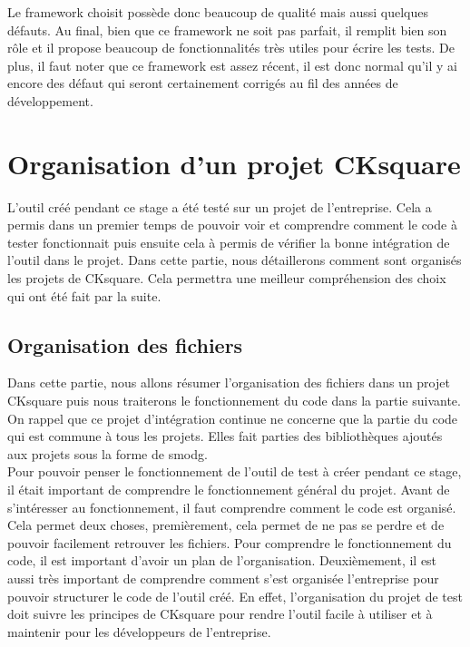 \documentclass[a4paper]{article}
\begin{document}
Le framework choisit possède donc beaucoup de qualité mais aussi quelques
défauts. Au final, bien que ce framework ne soit pas parfait, il remplit
bien son rôle et il propose beaucoup de fonctionnalités très utiles pour
écrire les tests. De plus, il faut noter que ce framework est assez récent, il
est donc normal qu'il y ai encore des défaut qui seront certainement corrigés
au fil des années de développement.
\section{Organisation d'un projet CKsquare}%

L'outil créé pendant ce stage a été testé sur un projet de l'entreprise. Cela a
permis dans un premier temps de pouvoir voir et comprendre comment le code à
tester fonctionnait puis ensuite cela à permis de vérifier la bonne intégration de
l'outil dans le projet. Dans cette partie, nous détaillerons comment sont
organisés les projets de CKsquare. Cela permettra une meilleur compréhension des
choix qui ont été fait par la suite.

\subsection{Organisation des fichiers}
\label{orgaprojck}

Dans cette partie, nous allons résumer l'organisation des fichiers dans un
projet CKsquare puis nous traiterons le fonctionnement du code dans la partie
suivante. On rappel que ce projet d'intégration continue ne concerne que la
partie du code qui est commune à tous les projets. Elles fait parties des
bibliothèques ajoutés aux projets sous la forme de \gls{smodg}. \\

Pour pouvoir penser le fonctionnement de l'outil de test à créer pendant ce
stage, il était important de comprendre le fonctionnement général du projet.
Avant de s'intéresser au fonctionnement, il faut comprendre comment le code est
organisé. Cela permet deux choses, premièrement, cela permet de ne pas se perdre
et de pouvoir facilement retrouver les fichiers. Pour comprendre le
fonctionnement du code, il est important d'avoir un plan de l'organisation.
Deuxièmement, il est aussi très important de comprendre comment s'est organisée
l'entreprise pour pouvoir structurer le code de l'outil créé. En
effet, l'organisation du projet de test doit suivre les principes de CKsquare
pour rendre l'outil facile à utiliser et à maintenir pour les développeurs de
l'entreprise.
\end{document}
